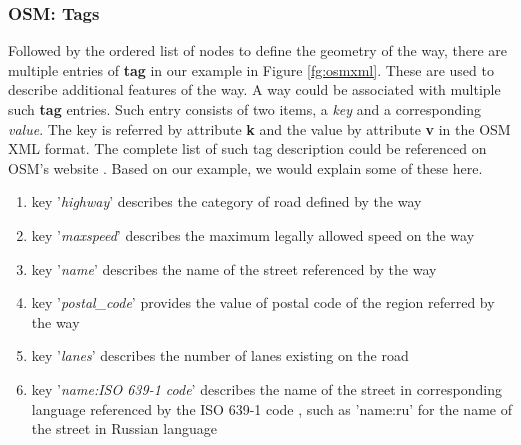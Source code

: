 \subsubsection{OSM: Tags} \label{tag}
Followed by the ordered list of nodes to define the geometry of the way, there are multiple entries of \textbf{tag} in our example in Figure \ref{fg:osmxml}. These are used to describe additional features of the way. A way could be associated with multiple such \textbf{tag} entries. Such entry consists of two items, a \textit{key} and a corresponding \textit{value}. The key is referred by attribute \textbf{k} and the value by attribute \textbf{v} in the OSM XML format. The complete list of such tag description could be referenced on OSM's website \cite{tag}. Based on our example, we would explain some of these here.
\begin{enumerate}
\item key '\textit{highway}' describes the category of road defined by the way
\item key '\textit{maxspeed}' describes the maximum legally allowed speed on the way
\item key '\textit{name}' describes the name of the street referenced by the way
\item key '\textit{postal{\_}code}' provides the value of postal code of the region referred by the way
\item key '\textit{lanes}' describes the number of lanes existing on the road
\item key '\textit{name:ISO 639-1 code}' describes the name of the street in corresponding language referenced by the ISO 639-1 code \cite{iso693}, such as 'name:ru' for the name of the street in Russian language
\end{enumerate}

